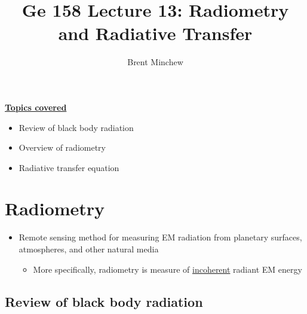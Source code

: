\documentclass[11pt, oneside]{article}
\title{Ge 158 Lecture 13: Radiometry and Radiative Transfer}
\author{Brent Minchew}
\date{}
\begin{document}
\maketitle

\noindent\underline{\textbf{Topics covered}}
\begin{itemize}
	\item Review of black body radiation
	\item Overview of radiometry
	\item Radiative transfer equation
\end{itemize}

\section{Radiometry}
\label{s:radiometry}

\begin{itemize}
	\item Remote sensing method for measuring EM radiation from planetary surfaces, atmospheres, and other natural media
	\begin{itemize}
		\item[$\rightarrow$] More specifically, radiometry is measure of \underline{incoherent} radiant EM energy
	\end{itemize}
\end{itemize}

\subsection{Review of black body radiation}
\label{s:review}
\end{document}
